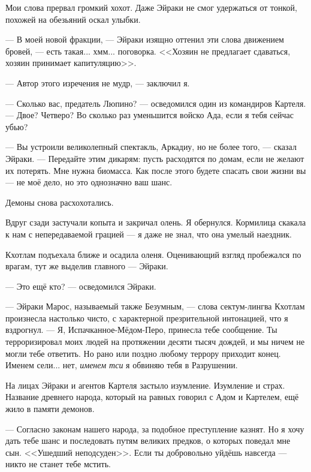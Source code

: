 Мои слова прервал громкий хохот.
Даже Эйраки не смог удержаться от тонкой, похожей на обезьяний оскал улыбки.

--- В моей новой фракции, --- Эйраки изящно оттенил эти слова движением бровей, --- есть такая... хмм... поговорка.
<<Хозяин не предлагает сдаваться, хозяин принимает капитуляцию>>.

--- Автор этого изречения не мудр, --- заключил я.

--- Сколько вас, предатель Люпино? --- осведомился один из командиров Картеля.
--- Двое?
Четверо?
Во сколько раз уменьшится войско Ада, если я тебя сейчас убью?

--- Вы устроили великолепный спектакль, Аркадиу, но не более того, --- сказал Эйраки.
--- Передайте этим дикарям: пусть расходятся по домам, если не желают их потерять.
Мне нужна биомасса.
Как после этого будете спасать свои жизни вы --- не моё дело, но это однозначно ваш шанс.

Демоны снова расхохотались.

Вдруг сзади застучали копыта и закричал олень.
Я обернулся.
Кормилица скакала к нам с непередаваемой грацией --- я даже не знал, что она умелый наездник.

Кхотлам подъехала ближе и осадила оленя.
Оценивающий взгляд пробежался по врагам, тут же выделив главного --- Эйраки.

--- Это ещё кто? --- осведомился Эйраки.

--- Эйраки Марос, называемый также Безумным, --- слова сектум-лингва Кхотлам произнесла настолько чисто, с характерной презрительной интонацией, что я вздрогнул.
--- Я, Испачканное-Мёдом-Перо, принесла тебе сообщение.
Ты терроризировал моих людей на протяжении десяти тысяч дождей, и мы ничем не могли тебе ответить.
Но рано или поздно любому террору приходит конец.
Именем сели... нет, \emph{именем тси} я обвиняю тебя в Разрушении.

На лицах Эйраки и агентов Картеля застыло изумление.
Изумление и страх.
Название древнего народа, который на равных говорил с Адом и Картелем, ещё жило в памяти демонов.

--- Согласно законам нашего народа, за подобное преступление казнят.
Но я хочу дать тебе шанс и последовать путям великих предков, о которых поведал мне сын.
<<Ушедший неподсуден>>\FM.
Если ты добровольно уйдёшь навсегда --- никто не станет тебе мстить.

